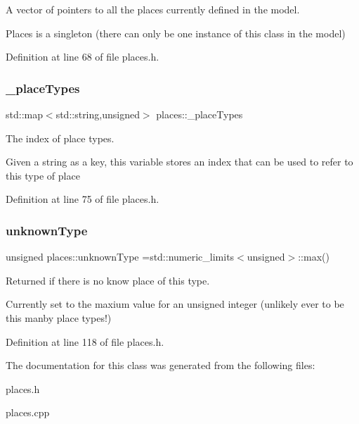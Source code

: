 A vector of pointers to all the places currently defined in the model. 

Places is a singleton (there can only be one instance of this class in the model) 

Definition at line 68 of file places.\+h.

\mbox{\label{classplaces_a7d5529185ae4635d2e2048b4ae475c12}} 
\subsubsection{\texorpdfstring{\+\_\+place\+Types}{\_placeTypes}}
{\footnotesize\ttfamily std\+::map$<$std\+::string,unsigned$>$ places\+::\+\_\+place\+Types\hspace{0.3cm}{\ttfamily [protected]}}



The index of place types. 

Given a string as a key, this variable stores an index that can be used to refer to this type of place 

Definition at line 75 of file places.\+h.

\mbox{\label{classplaces_ab03feda32ddd4784c17de8b2185b3563}} 
\subsubsection{\texorpdfstring{unknown\+Type}{unknownType}}
{\footnotesize\ttfamily unsigned places\+::unknown\+Type =std\+::numeric\+\_\+limits$<$unsigned$>$\+::max()\hspace{0.3cm}{\ttfamily [static]}}



Returned if there is no know place of this type. 

Currently set to the maxium value for an unsigned integer (unlikely ever to be this manby place types!) 

Definition at line 118 of file places.\+h.



The documentation for this class was generated from the following files\+:\begin{DoxyCompactItemize}
\item 
places.\+h\item 
places.\+cpp\end{DoxyCompactItemize}
